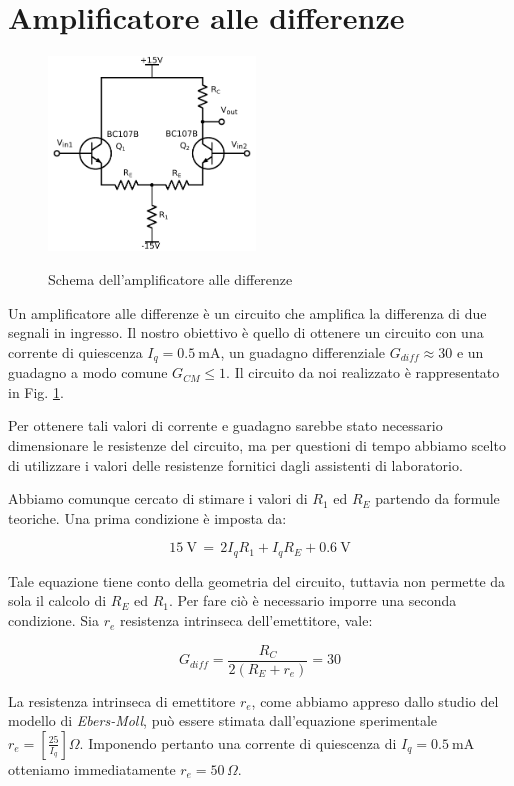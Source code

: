 \section{Amplificatore alle differenze}
\begin{figure}
	\caption{Schema dell'amplificatore alle differenze}
	\includegraphics[width=55mm]{cc1.pdf}
	\label{fig:cc1}
\end{figure}

Un amplificatore alle differenze è un circuito che amplifica la differenza di due segnali in ingresso.
Il nostro obiettivo è quello di ottenere un circuito con una corrente di quiescenza $I_q=\SI{0.5}{\milli\ampere}$, un guadagno differenziale $G_{diff}\approx 30$ e un guadagno a modo comune $G_{CM} \leq 1$.
Il circuito da noi realizzato è rappresentato in Fig. \ref{fig:cc1}.

Per ottenere tali valori di corrente e guadagno sarebbe stato necessario dimensionare le resistenze del circuito, ma per questioni di tempo abbiamo scelto di utilizzare i valori delle resistenze fornitici dagli assistenti di laboratorio.

Abbiamo comunque cercato di stimare i valori di $R_1$ ed $R_E$ partendo da formule teoriche.
Una prima condizione è imposta da:

\begin{equation}
\SI{15}{\volt} \,= \, 2I_q R_1 + I_q R_E + \SI{0.6}{\volt}
\label{eq:1}
\end{equation}

\noindent Tale equazione tiene conto della geometria del circuito, tuttavia non permette da sola il calcolo di $R_E$ ed $R_1$.
Per fare ciò è necessario imporre una seconda condizione. Sia $r_e$ resistenza intrinseca dell'emettitore, vale:

\begin{equation}
G_{diff}=\frac{R_C}{2(R_E+r_e)} = 30
\label{eq:2}
\end{equation}

La resistenza intrinseca di emettitore $r_e$, come abbiamo appreso dallo studio del modello di \textit{Ebers-Moll}, può essere stimata dall'equazione sperimentale $r_e = \left[ \frac{25}{I_q} \right] \Omega$.
Imponendo pertanto una corrente di quiescenza di $I_q = \SI{0.5}{\milli\ampere}$ otteniamo immediatamente $r_e = 50\, \Omega$.

